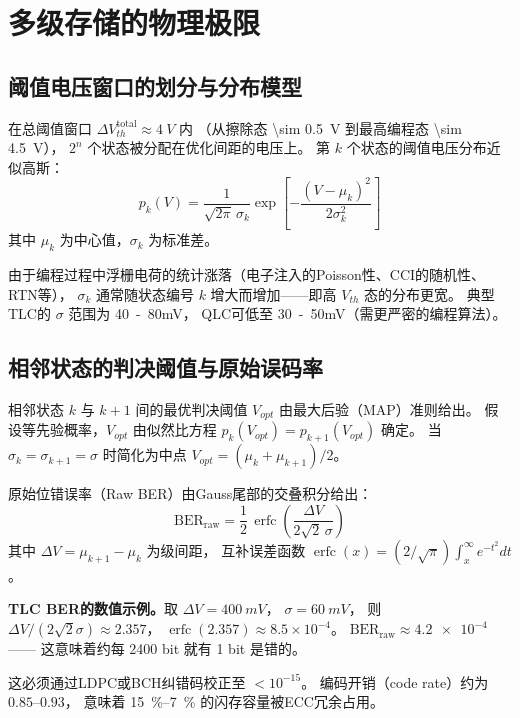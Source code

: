 \documentclass[11pt,a4paper,twoside]{article}
\theoremstyle{definition}
\theoremstyle{plain}
\theoremstyle{remark}
\begin{document}
\section{多级存储的物理极限}
\label{sec:mlc}

\subsection{阈值电压窗口的划分与分布模型}

在总阈值窗口 $\Delta V_{th}^{\text{total}} \approx \SI{4}{V}$ 内
（从擦除态 \SI{\sim 0.5}{V} 到最高编程态 \SI{\sim 4.5}{V}），
$2^n$ 个状态被分配在优化间距的电压上。
第 $k$ 个状态的阈值电压分布近似高斯：
\begin{equation}\label{eq:vth-gauss}
  p_k(V) = \frac{1}{\sqrt{2\pi}\,\sigma_k}
           \exp\!\left[ -\frac{(V - \mu_k)^2}{2\sigma_k^2} \right]
\end{equation}
其中 $\mu_k$ 为中心值，$\sigma_k$ 为标准差。

由于编程过程中浮栅电荷的统计涨落（电子注入的Poisson性、CCI的随机性、RTN等），
$\sigma_k$ 通常随状态编号 $k$ 增大而增加——即高 $V_{th}$ 态的分布更宽。
典型TLC的 $\sigma$ 范围为 \SI{40}{-80}{mV}，
QLC可低至 \SI{30}{-50}{mV}（需更严密的编程算法）。

\subsection{相邻状态的判决阈值与原始误码率}

相邻状态 $k$ 与 $k+1$ 间的最优判决阈值 $V_{opt}$ 由最大后验（MAP）准则给出。
假设等先验概率，$V_{opt}$ 由似然比方程 $p_k(V_{opt}) = p_{k+1}(V_{opt})$ 确定。
当 $\sigma_k = \sigma_{k+1} = \sigma$ 时简化为中点
$V_{opt} = (\mu_k + \mu_{k+1}) / 2$。

原始位错误率（Raw BER）由Gauss尾部的交叠积分给出：
\begin{equation}\label{eq:raw-ber}
  \boxed{ \text{BER}_{\text{raw}}
  = \frac{1}{2}\,\operatorname{erfc}\!\left(
    \frac{\Delta V}{2\sqrt{2}\,\sigma}
  \right) }
\end{equation}
其中 $\Delta V = \mu_{k+1} - \mu_k$ 为级间距，
互补误差函数 $\operatorname{erfc}(x) = (2/\sqrt{\pi}) \int_x^\infty e^{-t^2} dt$。

\begin{physbox}
  \textbf{TLC BER的数值示例。}取 $\Delta V = \SI{400}{mV}$，
  $\sigma = \SI{60}{mV}$，
  则 $\Delta V/(2\sqrt{2}\sigma) \approx 2.357$，
  $\operatorname{erfc}(2.357) \approx 8.5 \times 10^{-4}$。
  $\text{BER}_{\text{raw}} \approx \num{4.2e-4}$——
  这意味着约每 2400 bit 就有 1 bit 是错的。

  这必须通过LDPC或BCH纠错码校正至 $< 10^{-15}$。
  编码开销（code rate）约为 $0.85$--$0.93$，
  意味着 \SI{15}{\%}{--}\SI{7}{\%} 的闪存容量被ECC冗余占用。
\end{physbox}
\end{document}
